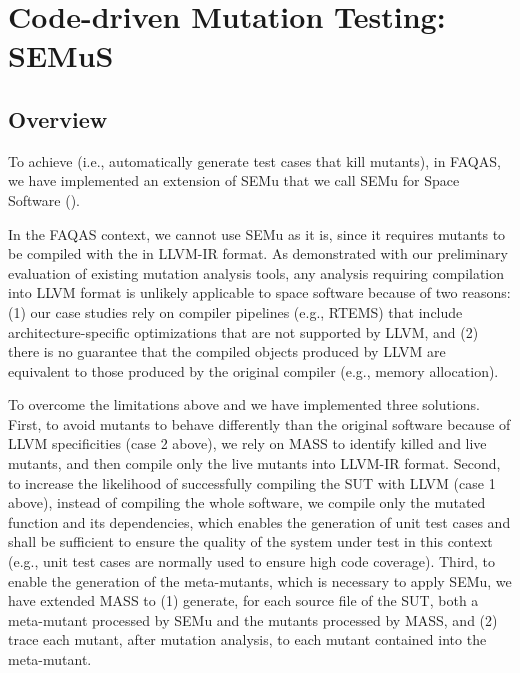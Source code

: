 
\newpage

\section{Code-driven Mutation Testing: SEMuS}

\subsection{Overview}
\label{sec:semus}





To achieve  (i.e., automatically generate test cases that kill mutants), in FAQAS, we have implemented an extension of SEMu that we call SEMu for Space Software ().



In the FAQAS context, we cannot use SEMu as it is, since it requires mutants to be compiled with the  in LLVM-IR format. As demonstrated with our preliminary evaluation of existing mutation analysis tools, any analysis requiring compilation into LLVM format is unlikely applicable to space software because of two reasons:  (1) our case studies rely on compiler pipelines (e.g., RTEMS) that include architecture-specific optimizations that are not supported by LLVM, and (2) there is no guarantee that the compiled objects produced by LLVM are equivalent to those produced by the original compiler (e.g., memory allocation). 

To overcome the limitations above and  we have implemented three solutions. 
First, to avoid mutants to behave differently than the original software because of LLVM specificities (case 2 above), we rely on  MASS to identify killed and live mutants, and then compile only the live mutants into LLVM-IR format. 
Second, to increase the likelihood of successfully compiling the SUT with LLVM (case 1 above),  instead of compiling the whole software, we compile only the mutated function and its dependencies, which enables the generation of unit test cases and shall be sufficient to ensure the quality of the system under test in this context (e.g., unit test cases are normally used to ensure high code coverage). Third, to enable the generation of the meta-mutants, which is necessary to apply SEMu, we have extended MASS to (1) generate, for each source file of the SUT, both a meta-mutant processed by SEMu and the mutants processed by MASS, and (2) trace each mutant, after mutation analysis, to each mutant contained into the meta-mutant. 






